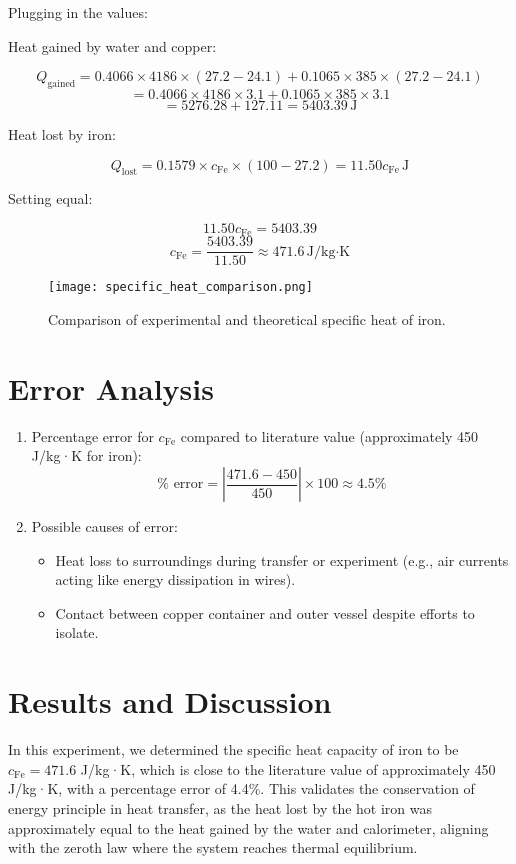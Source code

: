 \documentclass[12pt, a4paper]{article}
\begin{document}
Plugging in the values:

Heat gained by water and copper:

\[ Q_{\text{gained}} = 0.4066 \times 4186 \times (27.2 - 24.1) + 0.1065 \times 385 \times (27.2 - 24.1) \]
\[ = 0.4066 \times 4186 \times 3.1 + 0.1065 \times 385 \times 3.1 \]
\[ = 5276.28 + 127.11 = 5403.39 \, \text{J} \]

Heat lost by iron:

\[ Q_{\text{lost}} = 0.1579 \times c_{\text{Fe}} \times (100 - 27.2) = 11.50 c_{\text{Fe}} \, \text{J} \]

Setting equal:

\[ 11.50 c_{\text{Fe}} = 5403.39 \]
\[ c_{\text{Fe}} = \frac{5403.39}{11.50} \approx 471.6 \, \text{J/kg·K} \]

\begin{figure}[H]
    \centering
    \texttt{[image: specific\_heat\_comparison.png]}
    \caption{Comparison of experimental and theoretical specific heat of iron.}
    \label{fig:specific_heat_comparison}
\end{figure}

\section{Error Analysis}
\begin{enumerate}
\item Percentage error for $c_{\text{Fe}}$ compared to literature value (approximately 450 J/kg·K for iron):
\[ \% \text{ error} = \left| \frac{471.6 - 450}{450} \right| \times 100 \approx 4.5\% \]

\item Possible causes of error:
\begin{itemize}
\item Heat loss to surroundings during transfer or experiment (e.g., air currents acting like energy dissipation in wires).
\item Contact between copper container and outer vessel despite efforts to isolate.
\end{itemize}
\end{enumerate}

\section{Results and Discussion}
In this experiment, we determined the specific heat capacity of iron to be $c_{\text{Fe}} = 471.6$ J/kg·K, which is close to the literature value of approximately 450 J/kg·K, with a percentage error of 4.4\%. This validates the conservation of energy principle in heat transfer, as the heat lost by the hot iron was approximately equal to the heat gained by the water and calorimeter, aligning with the zeroth law where the system reaches thermal equilibrium.
\end{document}
